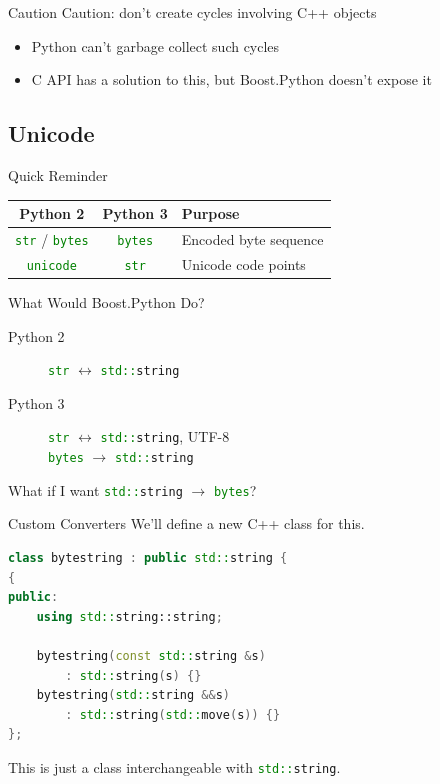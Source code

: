\documentclass{beamer}
\def\linlinep{\lstinline[basicstyle=\ttfamily,language=python]}
\def\linlinec{\lstinline[basicstyle=\ttfamily,language=c++]}
\begin{document}
\begin{frame}{Caution}
  \alert{Caution}: don't create cycles involving C++ objects
  \begin{itemize}
    \item Python can't garbage collect such cycles
    \item C API has a solution to this, but Boost.Python doesn't expose it
  \end{itemize}
\end{frame}

\subsection{Unicode}

\begin{frame}{Quick Reminder}
  \centering
  \begin{tabular}{ccl}
    \toprule
    \textbf{Python 2} & \textbf{Python 3} & \textbf{Purpose}\\
    \midrule
    \linlinep"str" / \linlinep"bytes" & \linlinep"bytes" & Encoded byte sequence\\
    \linlinep"unicode" & \linlinep"str" & Unicode code points\\
    \bottomrule
  \end{tabular}
\end{frame}

\begin{frame}{What Would Boost.Python Do?}
  \begin{description}
    \item[Python 2] \linlinep"str" $\leftrightarrow$ \linlinec"std::string"
    \item[Python 3] \linlinep"str" $\leftrightarrow$ \linlinec"std::string", UTF-8\\
                    \linlinep"bytes" $\rightarrow$ \linlinec"std::string"
  \end{description}
  \pause
  What if I want \linlinec"std::string" $\rightarrow$ \linlinep"bytes"?
\end{frame}

\begin{frame}[fragile=singleslide]{Custom Converters}
We'll define a new C++ class for this.
  \begin{lstlisting}[language=c++]
class bytestring : public std::string {
{
public:
    using std::string::string;

    bytestring(const std::string &s)
        : std::string(s) {}
    bytestring(std::string &&s)
        : std::string(std::move(s)) {}
};
  \end{lstlisting}

This is just a class interchangeable with \linlinec"std::string".
\end{frame}
\end{document}
